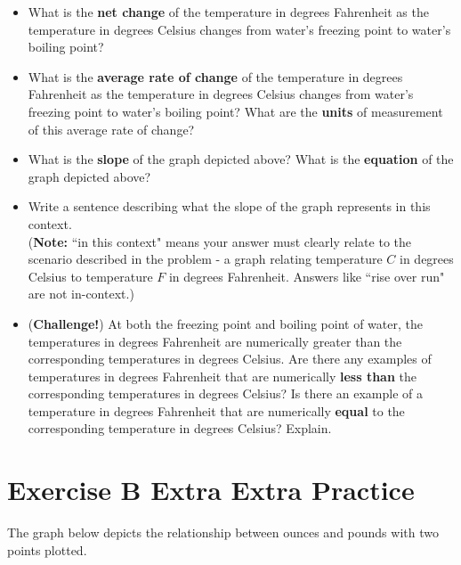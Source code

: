 \documentclass[12pt]{article}
\newcounter{example}[section]
\begin{document}
    \begin{itemize}
    
    \item[(a)] What is the {\bf net change} of the temperature in degrees Fahrenheit as the temperature in degrees Celsius changes from water's freezing point to water's boiling point?
    
    \item[(b)] What is the {\bf average rate of change} of the temperature in degrees Fahrenheit as the temperature in degrees Celsius changes from water's freezing point to water's boiling point? What are the {\bf units} of measurement of this average rate of change?
    
    \item[(c)] What is the {\bf slope} of the graph depicted above? What is the {\bf equation} of the graph depicted above?
    
    \item[(d)] Write a sentence describing what the slope of the graph represents in this context.\\ 
    ({\bf Note:} ``in this context" means your answer must clearly relate to the scenario described in the problem - a graph relating temperature $C$ in degrees Celsius to temperature $F$ in degrees Fahrenheit. Answers like ``rise over run" are not in-context.)

    \item[(e)] ({\bf Challenge!}) At both the freezing point and boiling point of water, the temperatures in degrees Fahrenheit are numerically greater than the corresponding temperatures in degrees Celsius. Are there any examples of temperatures in degrees Fahrenheit that are numerically {\bf less than} the corresponding temperatures in degrees Celsius? Is there an example of a temperature in degrees Fahrenheit that are numerically {\bf equal} to the corresponding temperature in degrees Celsius? Explain.
    
    \end{itemize}




\newpage
\section{Exercise B Extra Extra Practice}



The graph below depicts the relationship between ounces and pounds with two points plotted.
\end{document}
